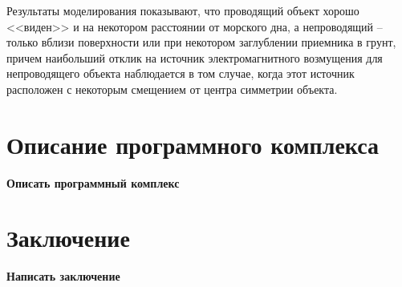 \documentclass[a4paper,14pt]{article}
\begin{document}
Результаты моделирования показывают, что проводящий объект хорошо <<виден>> и на некотором расстоянии от морского дна, а непроводящий -- только вблизи поверхности или при некотором заглублении приемника в грунт, причем наибольший отклик на источник электромагнитного возмущения для непроводящего объекта наблюдается в том случае, когда этот источник расположен с некоторым смещением от центра симметрии объекта.


\section{Описание программного комплекса}
{\color{red}\textbf{Описать программный комплекс}}


{}
\section*{Заключение}
{\color{red}\textbf{Написать заключение}}


\clearpage
{}
\end{document}
